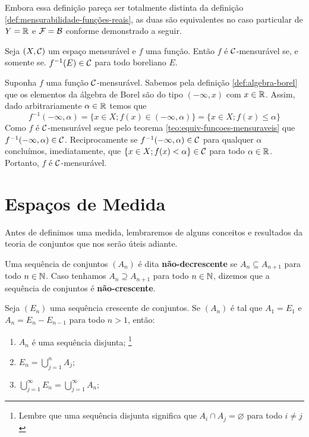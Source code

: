 Embora essa definição pareça ser totalmente distinta da definição \ref{def:mensurabilidade-funções-reais}, as duas são equivalentes no caso particular de $Y = \mathbb{R}$ e $\mathcal{F} = \operatorname{\mathcal{B}}$ conforme demonstrado a seguir.

\begin{proposition}
	Seja $(X, \operatorname{\mathcal{C}})$ um espaço mensurável e $f$ uma função.
	Então $f$ é $\operatorname{\mathcal{C}}$-mensurável se, e somente se. $f^{-1}(E) \in \operatorname{\mathcal{C}}$ para todo boreliano $E$. 
\end{proposition}
\begin{prova}
	Suponha $f$ uma função $\operatorname{\mathcal{C}}$-mensurável. 
	Sabemos pela definição \ref{def:algebra-borel} que os elementos da álgebra de Borel são do tipo $(-\infty,x)$ com $x \in \mathbb{R}$.
	Assim, dado arbitrariamente $\alpha \in \mathbb{R}$ temos que
	$$
	f^{-1}(-\infty, \alpha)
	=\{x \in X; f(x) \in (-\infty, \alpha)\}
	=\{x \in X; f(x) \leq \alpha\}
	$$
	Como $f$ é $\operatorname{\mathcal{C}}$-mensurável segue pelo teorema \ref{teo:equiv-funcoes-mensuraveis} que $f^{-1}(-\infty, \alpha) \in \operatorname{\mathcal{C}}$.
	Reciprocamente se 
	$f^{-1}(-\infty, \alpha) \in \operatorname{\mathcal{C}}$ para qualquer $\alpha$ concluímos, imediatamente, que $\{x \in X; f(x) < \alpha\} \in \operatorname{\mathcal{C}}$ para todo $\alpha \in \mathbb{R}$.
	Portanto, $f$ é $\operatorname{\mathcal{C}}$-mensurável.
\end{prova}

\section{Espaços de Medida}
Antes de definimos uma medida, lembraremos de alguns conceitos e resultados da teoria de conjuntos que nos serão úteis adiante.

\begin{definition}
\label{def:sequência-crescente-decrescente-de-conjuntos}
    Uma sequência de conjuntos $(A_n)$ é dita \textbf{não-decrescente} se $A_n \subseteq A_{n+1}$ para todo $n \in \operatorname{\mathbb{N}}$.
    Caso tenhamos $A_n \supseteq A_{n+1}$ para todo $n \in \operatorname{\mathbb{N}}$, dizemos que a sequência  de conjuntos é \textbf{não-crescente}.
\end{definition}

\begin{proposition}
\label{prop:sequencia-crescente-conjuntos-resultado-A_n}
Seja $(E_n)$ uma sequência crescente de conjuntos. Se $(A_n)$ é tal que $A_1 = E_1$ e $A_n = E_n - E_{n -1}$ para todo $n > 1$, então:
\begin{enumerate}[label* = (\roman*)]
    \item $A_n$ é uma sequência disjunta;
        \footnote{Lembre que uma sequência disjunta significa que $A_i \cap A_j = \varnothing$ para todo $i \neq j$}
    \item $E_n = \displaystyle \bigcup_{j = 1}^n A_j$;
    \item $\displaystyle \bigcup_{j = 1}^\infty E_n = \displaystyle \bigcup_{j = 1}^\infty A_n$;
\end{enumerate}
\end{proposition}

